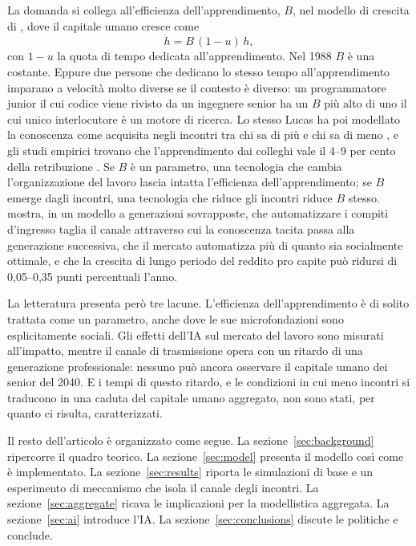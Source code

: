 \documentclass[preprint,12pt,authoryear]{elsarticle}
\begin{document}
La domanda si collega all'efficienza dell'apprendimento, $B$, nel modello di crescita di \citet{Lucas1988}, dove il capitale umano cresce come
\begin{equation}\label{eq:lucas}
\dot h = B\,(1-u)\,h,
\end{equation}
con $1-u$ la quota di tempo dedicata all'apprendimento. Nel 1988 $B$ è una costante. Eppure due persone che dedicano lo stesso tempo all'apprendimento imparano a velocità molto diverse se il contesto è diverso: un programmatore junior il cui codice viene rivisto da un ingegnere senior ha un $B$ più alto di uno il cui unico interlocutore è un motore di ricerca. Lo stesso Lucas ha poi modellato la conoscenza come acquisita negli incontri tra chi sa di più e chi sa di meno \citep{Lucas2009,LucasMoll2014}, e gli studi empirici trovano che l'apprendimento dai colleghi vale il 4--9 per cento della retribuzione \citep{Jarosch2021,Herkenhoff2024}. Se $B$ è un parametro, una tecnologia che cambia l'organizzazione del lavoro lascia intatta l'efficienza dell'apprendimento; se $B$ emerge dagli incontri, una tecnologia che riduce gli incontri riduce $B$ stesso. \citet{Ide2026} mostra, in un modello a generazioni sovrapposte, che automatizzare i compiti d'ingresso taglia il canale attraverso cui la conoscenza tacita passa alla generazione successiva, che il mercato automatizza più di quanto sia socialmente ottimale, e che la crescita di lungo periodo del reddito pro capite può ridursi di 0,05--0,35 punti percentuali l'anno.

La letteratura presenta però tre lacune. L'efficienza dell'apprendimento è di solito trattata come un parametro, anche dove le sue microfondazioni sono esplicitamente sociali. Gli effetti dell'IA sul mercato del lavoro sono misurati all'impatto, mentre il canale di trasmissione opera con un ritardo di una generazione professionale: nessuno può ancora osservare il capitale umano dei senior del 2040. E i tempi di questo ritardo, e le condizioni in cui meno incontri si traducono in una caduta del capitale umano aggregato, non sono stati, per quanto ci risulta, caratterizzati.

Il resto dell'articolo è organizzato come segue. La sezione~\ref{sec:background} ripercorre il quadro teorico. La sezione~\ref{sec:model} presenta il modello così come è implementato. La sezione~\ref{sec:results} riporta le simulazioni di base e un esperimento di meccanismo che isola il canale degli incontri. La sezione~\ref{sec:aggregate} ricava le implicazioni per la modellistica aggregata. La sezione~\ref{sec:ai} introduce l'IA. La sezione~\ref{sec:conclusions} discute le politiche e conclude.
\end{document}
